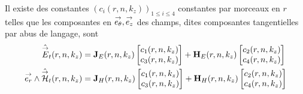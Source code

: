   \begin{prop}
    Il existe des constantes \((c_i(r,n,k_z))_{1\le i\le 4}\) constantes par morceaux en \(r\) telles que les composantes en \({\overset{\rightarrow}{e_\theta}},{\overset{\rightarrow}{e_z}}\) des champs, dites composantes tangentielles par abus de langage, sont
    \begin{subequations}
      \begin{align}
        \hat {{\overset{\rightarrow}{E}}}_t(r,n,k_z) &= \mathbf{J}_{E}(r,n,k_z)
        \begin{bmatrix}
          c_1(r,n,k_z) \\
          c_3(r,n,k_z)
        \end{bmatrix}
        +
        \mathbf{H}_{E}(r,n,k_z)
        \begin{bmatrix}
          c_2(r,n,k_z) \\
          c_4(r,n,k_z)
        \end{bmatrix}
        \label{eq:imp_fourier:cylindre:Et}
        \\
        {\overset{\rightarrow}{e_r}}\wedge\hat {{\overset{\rightarrow}{\mathcal{H}}}}_t(r,n,k_z) &=
        \mathbf{J}_{H}(r,n,k_z)
        \begin{bmatrix}
          c_1(r,n,k_z) \\
          c_3(r,n,k_z)
        \end{bmatrix}
        +
        \mathbf{H}_{H}(r,n,k_z)
        \begin{bmatrix}
          c_2(r,n,k_z) \\
          c_4(r,n,k_z)
        \end{bmatrix}
        \label{eq:imp_fourier:cylindre:Ht}
      \end{align}
    \end{subequations}
  \end{prop}


